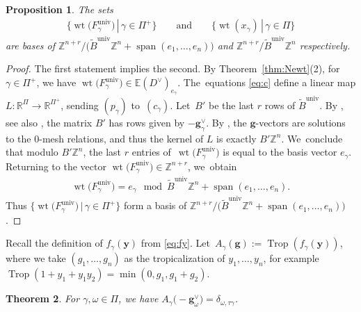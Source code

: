 \documentclass[10pt,a4paper]{amsart}
\def\R{{\mathbb R}}
\def\Z{{\mathbb Z}}
\def\univ{{\operatorname{univ}}}
\def\tB{{\tilde B}}
\def\sp{\operatorname{span}}
\def\wt{\operatorname{wt}}
\def\E{{\mathbb E}}
\def\tB{{\tilde B}}
\def\y{{\mathbf y}}
\def\Trop{\operatorname{Trop}}
\def\g{{\mathbf g}}
\numberwithin{equation}{section}
\newtheorem{Theorem}{Theorem}[section]
\newtheorem{Proposition}[Theorem]{Proposition}
\begin{document}
\begin{Proposition}\label{prop:wtbasis}
The sets \begin{gather*}
\big\{\wt\big(F^\univ_\gamma\big) \,|\, \gamma \in \Pi^+ \big\} \qquad \text{and} \qquad
\{\wt(x_\gamma) \,|\, \gamma \in \Pi\}
\end{gather*}
are bases of $\Z^{n+r}/\big(\tB^\univ \Z^n + \sp({e_1,\dots,e_n})\big)$ and $\Z^{n+r}/\tB^\univ \Z^n$ respectively.
\end{Proposition}
\begin{proof}
The first statement implies the second. By Theorem~\ref{thm:Newt}(2), for $\gamma \in \Pi^+$, we have $\wt\big(F^\univ_\gamma\big) \in \E(D^\vee)_{e_\gamma}$. The~equations \eqref{eq:c} define a linear map $L\colon \R^{\Pi} \to \R^{\Pi^+}$, sending $(p_\gamma)$ to~$(c_\gamma)$. Let~$B'$ be the last $r$ rows of $\tB^\univ$. By \cite{Reading}, see also \cite[Section~8]{BDMTY}, the matrix $B'$ has rows given by $-\g^\vee_\gamma$. By \cite[relation~(6.13)]{CA4}, the $\g$-vectors are solutions to the $0$-mesh relations, and thus the kernel of $L$ is exactly $B' \Z^n$. We~conclude that modulo $B'\Z^n$, the last $r$ entries of~$\wt\big(F^\univ_\gamma\big)$ is equal to the basis vector $e_\gamma$. Returning to the vector $\wt\big(F^\univ_\gamma\big) \in \Z^{n+r}$, we~obtain
\begin{gather*}
\wt\big(F^\univ_\gamma\big) = e_\gamma \mod \tB^\univ \Z^n + \sp({e_1,\dots,e_n}).
\end{gather*}
Thus
$\big\{\wt\big(F^\univ_\gamma\big) \,|\, \gamma \in \Pi^+\big\}$
form a basis of $\Z^{n+r}/\big(\tB^\univ \Z^n + \sp({e_1,\dots,e_n})\big)$.
\end{proof}

\bigskip{} %
Recall the definition of $f_\gamma(\y)$ from \eqref{eq:fy}. Let~$A_\gamma(\g):= \Trop(f_\gamma(\y))$, where we take $(g_1,\dots,g_n)$ as the tropicalization of $y_1,\dots,y_n$, for example $\Trop(1+y_1+y_1y_2) = \min(0,g_1,\allowbreak g_1+g_2)$.

\begin{Theorem}\label{thm:pair}
For $\gamma,\omega \in\Pi$, we have $A_\gamma\big({-}\g^\vee_\omega\big) = \delta_{\omega, \tau \gamma}$.
\end{Theorem}
\end{document}

